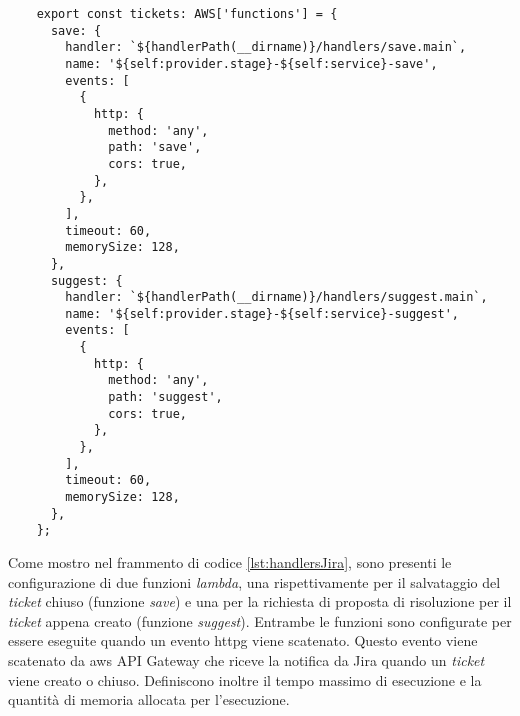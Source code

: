 \begin{verbatim}
    export const tickets: AWS['functions'] = {
      save: {
        handler: `${handlerPath(__dirname)}/handlers/save.main`,
        name: '${self:provider.stage}-${self:service}-save',
        events: [
          {
            http: {
              method: 'any',
              path: 'save',
              cors: true,
            },
          },
        ],
        timeout: 60,
        memorySize: 128,
      },
      suggest: {
        handler: `${handlerPath(__dirname)}/handlers/suggest.main`,
        name: '${self:provider.stage}-${self:service}-suggest',
        events: [
          {
            http: {
              method: 'any',
              path: 'suggest',
              cors: true,
            },
          },
        ],
        timeout: 60,
        memorySize: 128,
      },
    };
\end{verbatim}
\label{lst:handlersJira}

Come mostro nel frammento di codice \ref{lst:handlersJira}, sono presenti le configurazione di due funzioni \textit{lambda}, una rispettivamente per il salvataggio del \textit{ticket} chiuso (funzione \textit{save}) e una per la richiesta di proposta di risoluzione per il \textit{ticket} appena creato (funzione \textit{suggest}).  Entrambe le funzioni sono configurate per essere eseguite quando un evento \gls{httpg} viene scatenato. Questo evento viene scatenato da \gls{aws} API Gateway che riceve la notifica da Jira quando un \textit{ticket} viene creato o chiuso.
Definiscono inoltre il tempo massimo di esecuzione e la quantità di memoria allocata per l'esecuzione.


